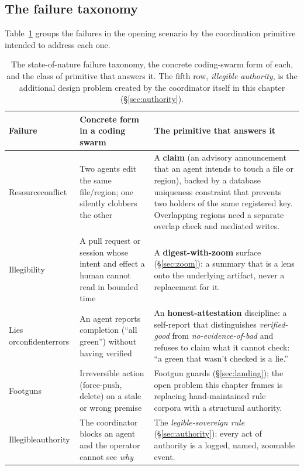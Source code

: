 \documentclass[11pt,a4paper]{article}
\theoremstyle{definition}
\theoremstyle{plain}
\begin{document}
\subsection{The failure taxonomy}\label{sec:taxonomy}
Table~\ref{tab:taxonomy} groups the failures in the opening scenario by
the coordination primitive intended to address each one.
\begin{table}[H]
\centering
\small
\renewcommand{\arraystretch}{1.3}
\begin{tabular}{@{}>{\raggedright\arraybackslash}p{}>{\raggedright\arraybackslash}p{}>{\raggedright\arraybackslash}p{}@{}}
\toprule
\textbf{Failure} & \textbf{Concrete form in a coding swarm} & \textbf{The primitive that answers it} \\
\midrule
Resource\newline conflict & Two agents edit the same file/region; one silently clobbers the other &
A \textbf{claim} (an advisory announcement that an agent intends to touch a
file or region), backed by a database uniqueness constraint that prevents
two holders of the same registered key. Overlapping regions
need a separate overlap check and mediated writes. \\
Illegibility & A pull request or session whose intent and effect a human cannot read in bounded time &
A \textbf{digest-with-zoom} surface (\S\ref{sec:zoom}): a summary that is a lens onto
the underlying artifact, never a replacement for it. \\
Lies or\newline confident\newline errors & An agent reports completion (``all green'') without having verified &
An \textbf{honest-attestation} discipline: a self-report that distinguishes
\emph{verified-good} from \emph{no-evidence-of-bad} and refuses to claim what it
cannot check: ``a green that wasn't checked is a lie.'' \\
Footguns & Irreversible action (force-push, delete) on a stale or wrong premise &
Footgun guards (\S\ref{sec:landing}); the open problem this chapter frames is
replacing hand-maintained rule corpora with a structural authority. \\
Illegible\newline authority & The coordinator blocks an agent and the operator cannot see \emph{why} &
The \emph{legible-sovereign rule} (\S\ref{sec:authority}): every act of authority is
a logged, named, zoomable event. \\
\bottomrule
\end{tabular}
\caption{The state-of-nature failure taxonomy, the concrete coding-swarm form of
each, and the class of primitive that answers it. The fifth row, \emph{illegible
authority}, is the additional design problem created by the coordinator itself
in this chapter (\S\ref{sec:authority}).}
\label{tab:taxonomy}
\end{table}
\end{document}
